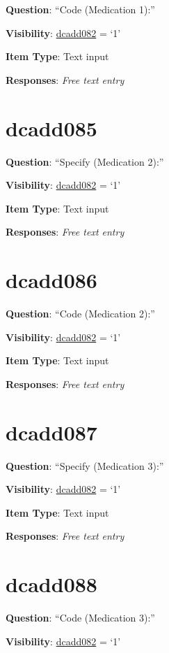 \documentclass[]{book}
\begin{document}
\textbf{Question}: ``Code (Medication 1):''

\textbf{Visibility}: \protect\hyperlink{dcadd082}{dcadd082} = `1'

\textbf{Item Type}: Text input

\textbf{Responses}: \emph{Free text entry}

\hypertarget{dcadd085}{%
\section{dcadd085}\label{dcadd085}}

\textbf{Question}: ``Specify (Medication 2):''

\textbf{Visibility}: \protect\hyperlink{dcadd082}{dcadd082} = `1'

\textbf{Item Type}: Text input

\textbf{Responses}: \emph{Free text entry}

\hypertarget{dcadd086}{%
\section{dcadd086}\label{dcadd086}}

\textbf{Question}: ``Code (Medication 2):''

\textbf{Visibility}: \protect\hyperlink{dcadd082}{dcadd082} = `1'

\textbf{Item Type}: Text input

\textbf{Responses}: \emph{Free text entry}

\hypertarget{dcadd087}{%
\section{dcadd087}\label{dcadd087}}

\textbf{Question}: ``Specify (Medication 3):''

\textbf{Visibility}: \protect\hyperlink{dcadd082}{dcadd082} = `1'

\textbf{Item Type}: Text input

\textbf{Responses}: \emph{Free text entry}

\hypertarget{dcadd088}{%
\section{dcadd088}\label{dcadd088}}

\textbf{Question}: ``Code (Medication 3):''

\textbf{Visibility}: \protect\hyperlink{dcadd082}{dcadd082} = `1'
\end{document}
